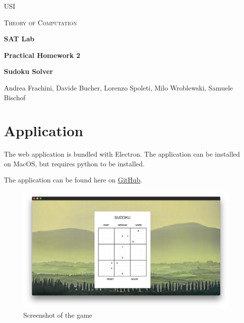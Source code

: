 \documentclass[10pt]{article}
\begin{document}
\begin{titlepage}
	\centering
  {\scshape\Large USI\par}
	{\scshape\Large Theory of Computation\par}
	\vspace{4.5cm}
  {\huge\bfseries SAT Lab\par}\vspace{0.5cm}
	{\large\bfseries Practical Homework 2\par}
  \vspace{2.5cm}
  {\Large\bfseries Sudoku Solver\par}\vspace{0.5cm}
	\vspace{6cm}
	{\Large Andrea Frachini, Davide Bucher, Lorenzo Spoleti, Milo Wroblewski, Samuele Bischof\par}

\end{titlepage}

\section*{Application}
The web application is bundled with Electron.
The application can be installed on MacOS, but requires python
to be installed.\par\vspace{0.5cm}
The application can be found here on \href{https://github.com/samuelebischof-ch/sudoku-sat}{GitHub}.

\begin{figure}[H]
  \centering
  \includegraphics[width=\textwidth]{sudoku.png}
  \caption{Screenshot of the game}
\end{figure}
\par\vspace{1cm}
\end{document}
